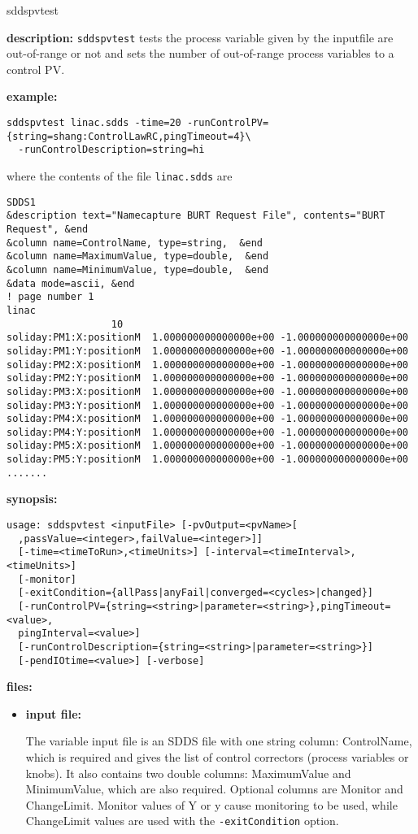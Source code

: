 \begin{sddsprog}{sddspvtest}
\item {\bf description:}
\verb+sddspvtest+ tests the process variable given by the inputfile are out-of-range
or not and sets the number of out-of-range process variables to a control PV.

\item {\bf example:} 
% 
\begin{verbatim}
sddspvtest linac.sdds -time=20 -runControlPV={string=shang:ControlLawRC,pingTimeout=4}\
  -runControlDescription=string=hi
\end{verbatim}
where the contents of the file \verb+linac.sdds+ are
\begin{verbatim}
SDDS1
&description text="Namecapture BURT Request File", contents="BURT Request", &end
&column name=ControlName, type=string,  &end
&column name=MaximumValue, type=double,  &end
&column name=MinimumValue, type=double,  &end
&data mode=ascii, &end
! page number 1
linac
                  10
soliday:PM1:X:positionM  1.000000000000000e+00 -1.000000000000000e+00 
soliday:PM1:Y:positionM  1.000000000000000e+00 -1.000000000000000e+00 
soliday:PM2:X:positionM  1.000000000000000e+00 -1.000000000000000e+00 
soliday:PM2:Y:positionM  1.000000000000000e+00 -1.000000000000000e+00 
soliday:PM3:X:positionM  1.000000000000000e+00 -1.000000000000000e+00 
soliday:PM3:Y:positionM  1.000000000000000e+00 -1.000000000000000e+00 
soliday:PM4:X:positionM  1.000000000000000e+00 -1.000000000000000e+00 
soliday:PM4:Y:positionM  1.000000000000000e+00 -1.000000000000000e+00 
soliday:PM5:X:positionM  1.000000000000000e+00 -1.000000000000000e+00 
soliday:PM5:Y:positionM  1.000000000000000e+00 -1.000000000000000e+00 
.......

\end{verbatim}

\item {\bf synopsis:}
\begin{verbatim}
usage: sddspvtest <inputFile> [-pvOutput=<pvName>[
  ,passValue=<integer>,failValue=<integer>]]
  [-time=<timeToRun>,<timeUnits>] [-interval=<timeInterval>,<timeUnits>]
  [-monitor]
  [-exitCondition={allPass|anyFail|converged=<cycles>|changed}]
  [-runControlPV={string=<string>|parameter=<string>},pingTimeout=<value>,
  pingInterval=<value>]
  [-runControlDescription={string=<string>|parameter=<string>}]
  [-pendIOtime=<value>] [-verbose]
\end{verbatim}
\item {\bf files:}
\begin{itemize}
\item {\bf input file:} \par
The variable input file is an SDDS file with one string column: ControlName, which is required
and gives the list of control correctors (process variables or knobs). It also contains two
double columns: MaximumValue and MinimumValue, which are also required. Optional columns
are Monitor and ChangeLimit. Monitor values of Y or y cause monitoring to be used, while
ChangeLimit values are used with the \verb|-exitCondition| option.
\end{itemize}


\end{sddsprog}
